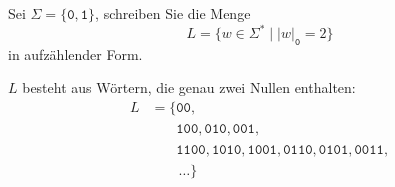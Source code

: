 Sei $\Sigma=\{\texttt{0},\texttt{1}\}$, schreiben Sie die Menge 
\[
L
=
\{w\in\Sigma^*\mid |w|_{\texttt{0}} = 2\}
\]
in aufzählender Form.

\begin{loesung}
$L$ besteht aus Wörtern, die genau zwei Nullen enthalten:
\begin{align*}
L
&=\{
\texttt{00},\\
&\phantom{=\{}
\texttt{100},
\texttt{010},
\texttt{001},\\
&\phantom{=\{}
\texttt{1100},
\texttt{1010},
\texttt{1001},
\texttt{0110},
\texttt{0101},
\texttt{0011},\\
&\qquad\dots\}
\end{align*}
\end{loesung}
